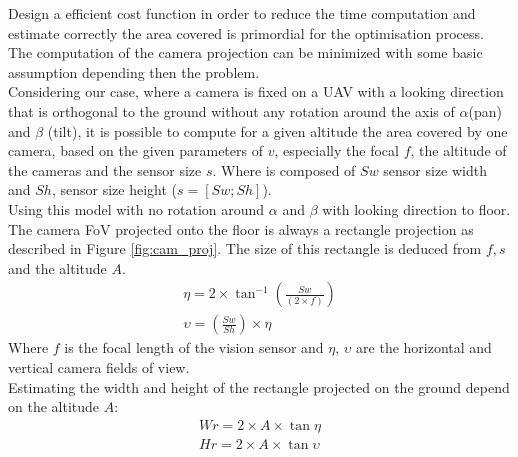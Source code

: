 Design a efficient cost function in order to reduce the time computation and estimate correctly the area covered is primordial for the optimisation process. 
  The computation of the camera projection can be minimized with some basic assumption depending then the problem.\\
Considering our case, where a camera is fixed on a UAV with a looking direction that is orthogonal to the ground without any rotation around the axis of $\alpha$(pan) and $\beta$ (tilt), it is  possible to compute for a given altitude the area covered by one camera, based on the given parameters of $v$, especially the focal $f$, the altitude of the cameras and the sensor size $s$. Where is composed of $Sw$ sensor size width and $Sh$, sensor size height ($s= [Sw ; Sh]$). \\
Using this model with no rotation around  $\alpha$ and $\beta$ with looking direction to floor. The camera FoV projected onto the floor is always a rectangle projection as described in Figure \ref{fig:cam_proj}. The size of this rectangle is deduced from $ f ,s$ and the altitude $A$. 
%
\begin{equation} \label{eq:etaUpsilon}
  \begin{split}
	\eta = 2\times \tan^{-1} (\frac{Sw}{(2\times f)}  ) 
    \\
	\upsilon = (\frac{Sw}{Sh} )\times \eta
  \end{split}
\end{equation}
Where $f$ is the focal length of the vision sensor and 
$\eta$, $\upsilon$ are the horizontal and vertical camera fields of view.\\
Estimating the width and height of the rectangle projected on the ground depend on the altitude $A$:
\begin{equation}\label{eq:WrHr1}
	\begin{split}
    	Wr= 2\times A\times\tan \eta
        \\
        Hr= 2\times A\times\tan \upsilon
     \end{split}
\end{equation} 
